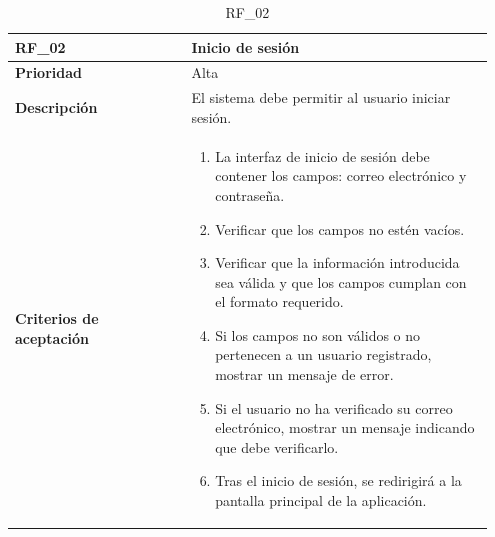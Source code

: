 \begin{table}[htb!]
    \begin{tabular}{|p{0.35\linewidth}|p{0.6\linewidth}|}
        \hline
        \rowcolor[HTML]{C0C0C0}  
        \textbf{RF\_02} & \textbf{Inicio de sesión} \\
        \hline
        \textbf{Prioridad} & Alta \\
        \hline
        \textbf{Descripción} & El sistema debe permitir al usuario iniciar sesión.  \\
        \hline
        \vspace{0.5mm}
        \textbf{Criterios de aceptación} & 
        \begin{minipage}[t]{0.9\linewidth}
            \begin{enumerate}
                \item La interfaz de inicio de sesión debe contener los campos: correo electrónico y contraseña.
                \item Verificar que los campos no estén vacíos.
                \item Verificar que la información introducida sea válida y que los campos cumplan con el formato requerido.
                \item Si los campos no son válidos o no pertenecen a un usuario registrado, mostrar un mensaje de error.
                \item Si el usuario no ha verificado su correo electrónico, mostrar un mensaje indicando que debe verificarlo.
                \item Tras el inicio de sesión, se redirigirá a la pantalla principal de la aplicación.
            \end{enumerate}
            \vspace{2mm}
        \end{minipage} \\
        \hline
    \end{tabular}
    \caption{RF\_02}

\end{table}


